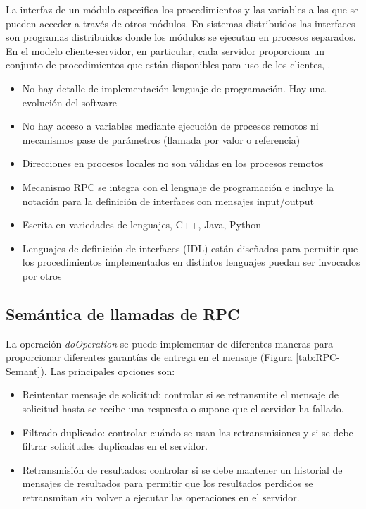 La interfaz de un módulo especifica los procedimientos y las variables a las que se pueden acceder a trav\'es de  otros módulos. 
En sistemas distribuidos las interfaces son  programas distribuidos donde los módulos se ejecutan en procesos separados.
En el modelo cliente-servidor, en particular, cada servidor proporciona un conjunto de procedimientos que están disponibles para uso de los clientes, \cite{Vitillo2021} \cite{Coulouris2011}.
\begin{itemize}
	\item No hay detalle de implementación lenguaje de programación. Hay una evolución del software
	\item No hay acceso a variables mediante ejecución de procesos remotos ni mecanismos pase de parámetros (llamada por valor o referencia)
	\item  Direcciones en procesos locales no son válidas en los procesos remotos
	
	\item  Mecanismo RPC se integra con el lenguaje de programación e incluye la notación  para la definición de interfaces con mensajes input/output
	\item Escrita en variedades de lenguajes, C++, Java, Python
	\item Lenguajes de definición de interfaces (IDL) están diseñados para permitir que los procedimientos implementados en distintos lenguajes puedan ser invocados por otros
	
\end{itemize}

\subsection{Semántica de llamadas de RPC}

La operaci\'on \textit{doOperation} se puede implementar de diferentes maneras para proporcionar diferentes garantías de entrega en el mensaje (Figura \ref{tab:RPC-Semant}). Las principales opciones son:
\begin{itemize}
	\item Reintentar mensaje de solicitud: controlar si se retransmite el mensaje de solicitud hasta se recibe una respuesta o supone que el servidor ha fallado. 
	\item Filtrado duplicado: controlar cuándo se usan las retransmisiones y si se debe filtrar solicitudes duplicadas en el servidor. 
	\item Retransmisión de resultados: controlar si se debe mantener un historial de mensajes de resultados para permitir que los resultados perdidos se retransmitan sin volver a ejecutar las operaciones en el servidor.
\end{itemize}

